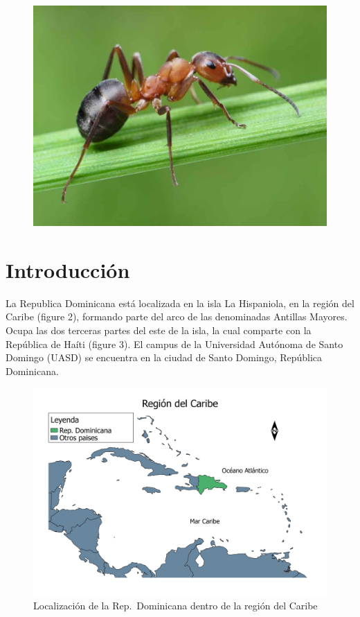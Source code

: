 \documentclass[11pt,]{article}
\begin{document}
\begin{figure}
\centering
\includegraphics{Hormiga-1.jpg}
\caption{}
\end{figure}

\section{Introducción}\label{introducciuxf3n}

La Republica Dominicana está localizada en la isla La Hispaniola, en la
región del Caribe (figure 2), formando parte del arco de las denominadas
Antillas Mayores. Ocupa las dos terceras partes del este de la isla, la
cual comparte con la República de Haíti (figure 3). El campus de la
Universidad Autónoma de Santo Domingo (UASD) se encuentra en la ciudad
de Santo Domingo, República Dominicana.

\begin{figure}
\centering
\includegraphics{caribe.jpeg}
\caption{Localización de la Rep.~Dominicana dentro de la región del
Caribe}
\end{figure}
\end{document}
